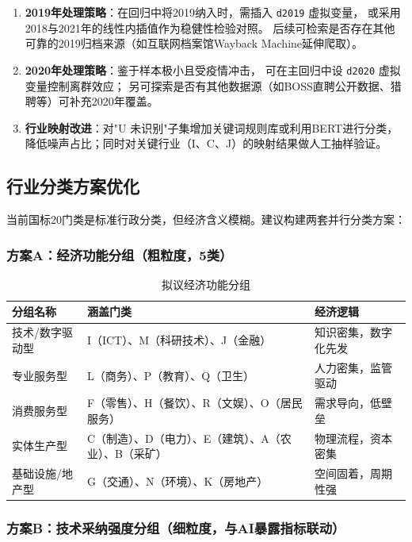 \documentclass[12pt,a4paper]{ctexart}
\begin{document}
\begin{enumerate}[label=\textbf{\arabic*.}]
    \item \textbf{2019年处理策略}：在回归中将2019纳入时，需插入 \texttt{d2019} 虚拟变量，
    或采用2018与2021年的线性内插值作为稳健性检验对照。
    后续可检索是否存在其他可靠的2019归档来源（如互联网档案馆Wayback Machine延伸爬取）。

    \item \textbf{2020年处理策略}：鉴于样本极小且受疫情冲击，
    可在主回归中设 \texttt{d2020} 虚拟变量控制离群效应；
    另可探索是否有其他数据源（如BOSS直聘公开数据、猎聘等）可补充2020年覆盖。

    \item \textbf{行业映射改进}：对"U 未识别"子集增加关键词规则库或利用BERT进行分类，
    降低噪声占比；同时对关键行业（I、C、J）的映射结果做人工抽样验证。
\end{enumerate}

\subsection{行业分类方案优化}
\label{sec:plan_industry}

当前国标20门类是标准行政分类，但经济含义模糊。建议构建两套并行分类方案：

\subsubsection{方案A：经济功能分组（粗粒度，5类）}

\begin{table}[H]
\centering
\caption{拟议经济功能分组}
\begin{tabular}{lll}
\toprule
分组名称 & 涵盖门类 & 经济逻辑 \\
\midrule
技术/数字驱动型 & I（ICT）、M（科研技术）、J（金融） & 知识密集，数字化先发 \\
专业服务型 & L（商务）、P（教育）、Q（卫生） & 人力密集，监管驱动 \\
消费服务型 & F（零售）、H（餐饮）、R（文娱）、O（居民服务） & 需求导向，低壁垒 \\
实体生产型 & C（制造）、D（电力）、E（建筑）、A（农业）、B（采矿） & 物理流程，资本密集 \\
基础设施/地产型 & G（交通）、N（环境）、K（房地产） & 空间固着，周期性强 \\
\bottomrule
\end{tabular}
\end{table}

\subsubsection{方案B：技术采纳强度分组（细粒度，与AI暴露指标联动）}
\end{document}
